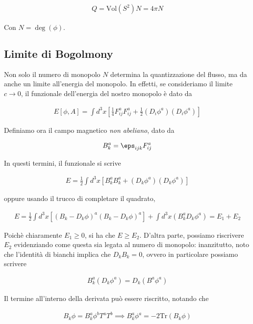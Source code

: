 \documentclass{report}
\begin{document}
\begin{align}
    Q = \text{Vol}(S^2)N = 4\pi N
\end{align}

Con \(N = \deg(\phi)\).


\subsection{Limite di Bogolmony}

Non solo il numero di monopolo \(N\) determina la quantizzazione del flusso, ma da anche un limite all'energia del monopolo. In effetti, se consideriamo il limite \(c \rightarrow 0\), il funzionale dell'energia del nostro monopolo è dato da 

\begin{align}
    E[\phi, A] = \int d^3 x [\frac{1}{4}F^a_{ij}F^a_{ij} + \frac{1}{2}(D_i \phi^a)(D_i \phi^a)]
\end{align}

Definiamo ora il campo magnetico \emph{non abeliano}, dato da 

\begin{align}
    B^a_k = \eps_{ijk}F^a_{ij}
\end{align}

In questi termini, il funzionale si scrive 

\begin{align}
    E = \frac{1}{2}\int d^3x [B^a_k B^a_k + (D_k \phi^a)(D_k \phi^a)]
\end{align}

oppure usando il trucco di completare il quadrato, 

\begin{align}
    E = \frac{1}{2}\int d^3x [(B_k -D_k\phi)^a(B_k -D_k\phi)^a ] + \int d^3x (B^a_k D_k \phi^a) = E_1 + E_2
\end{align}


Poichè chiaramente \(E_1 \geq 0\), si ha che \(E \geq E_2\). D'altra parte, possiamo riscrivere \(E_2\) evidenziando come questa sia legata al numero di monopolo: inanzitutto, noto che l'identità di bianchi implica che \(D_k B_k = 0\), ovvero in particolare possiamo scrivere 

\begin{align}
    B^a_k(D_k \phi^a) = D_k(B^a \phi^a)
\end{align}

Il termine all'interno della derivata può essere riscritto, notando che 

\begin{align}
    B_k \phi = B^a_k \phi^b T^a T^b \implies B^a_k \phi^a = -2\text{Tr}(B_k \phi)
\end{align}
\end{document}
